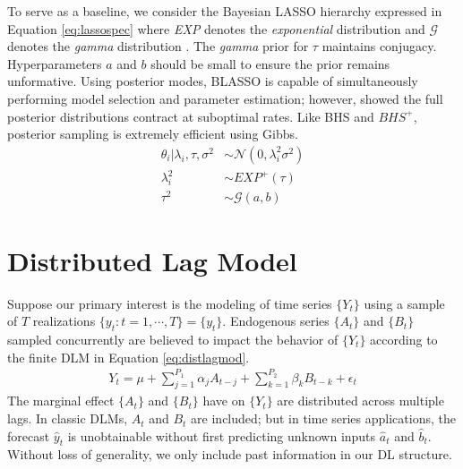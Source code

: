 To serve as a baseline, we consider the Bayesian LASSO hierarchy expressed in Equation \ref{eq:lassospec} where \textit{EXP} denotes the \textit{exponential} distribution and $\mathcal{G}$ denotes the \textit{gamma} distribution \citep{Park2008}. The \textit{gamma} prior for $\tau$ maintains conjugacy. Hyperparameters $a$ and $b$ should be small to ensure the prior remains unformative.  Using posterior modes, BLASSO is capable of simultaneously performing model selection and parameter estimation; however, \cite{Castillo2012} showed the full posterior distributions contract at suboptimal rates. Like BHS and $\textit{BHS}^+$, posterior sampling is extremely efficient using Gibbs.
\begin{equation}
\label{eq:lassospec}
\begin{split}
	\theta_i|\lambda_i,\tau,\sigma^2 & \sim \mathcal{N}(0,\lambda^2_i \sigma^2) \\
	\lambda^2_i &\sim \textit{EXP}^+(\tau)\\
	\tau^2 & \sim \mathcal{G}(a,b)
\end{split}
\end{equation}







\bigskip
\section{Distributed Lag Model}
\label{sec:dlm}
Suppose our primary interest is the modeling of time series $\{Y_t\}$ using a sample of $T$ realizations $\{y_t:t=1,\cdots,T\}=\{y_t\}$. Endogenous series $\{A_t\}$ and $\{B_t\}$ sampled concurrently are believed to impact the behavior of $\{Y_t\}$ according to the finite DLM in Equation \ref{eq:distlagmod}. 
\begin{equation}
\label{eq:distlagmod}
\begin{split}
 Y_t=\mu+\sum\limits_{j=1}^{P_1} \alpha_j A_{t-j} +\sum\limits_{k=1}^{P_2} \beta_k B_{t-k}+\epsilon_t 
\end{split}
\end{equation}
The marginal effect $\{A_t\}$ and $\{B_t\}$ have on $\{Y_t\}$ are distributed across multiple lags. In classic DLMs, $A_t$ and $B_t$ are included; but in time series applications, the forecast $\hat{y}_t$ is unobtainable without first predicting unknown inputs $\hat{a}_t$ and $\hat{b}_t$. Without loss of generality, we only include past information in our DL structure.

